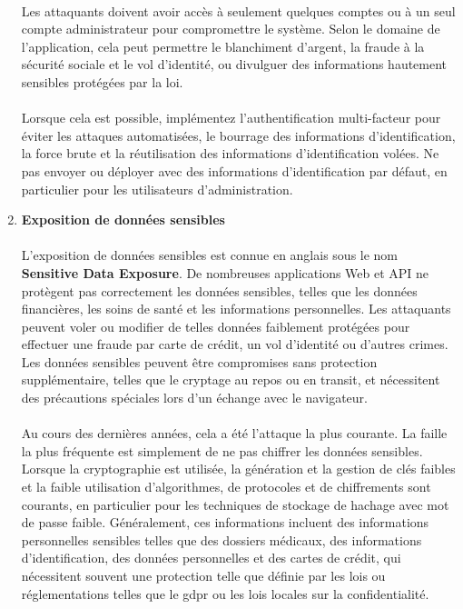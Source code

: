 \begin{enumerate}[label=\roman*)]
		\paragraph{}
		Les attaquants doivent avoir accès à seulement quelques comptes ou à un seul compte administrateur pour compromettre le système. Selon le domaine de l'application, cela peut permettre le blanchiment d'argent, la fraude à la sécurité sociale et le vol d'identité, ou divulguer des informations hautement sensibles protégées par la loi.
		\paragraph{}
		Lorsque cela est possible, implémentez l'authentification multi-facteur pour éviter les attaques automatisées, le bourrage des informations d'identification, la force brute et la réutilisation des informations d'identification volées. Ne pas envoyer ou déployer avec des informations d'identification par défaut, en particulier pour les utilisateurs d'administration.
		
		\vspace*{0.8cm} \item \textbf{Exposition de données sensibles} \vspace*{-0.4cm}
		\paragraph{}
		L'exposition de données sensibles est connue en anglais sous le nom \textbf{Sensitive Data Exposure}.
		De nombreuses applications Web et API ne protègent pas correctement les données sensibles, telles que les données financières, les soins de santé et les informations personnelles. Les attaquants peuvent voler ou modifier de telles données faiblement protégées pour effectuer une fraude par carte de crédit, un vol d'identité ou d'autres crimes. Les données sensibles peuvent être compromises sans protection supplémentaire, telles que le cryptage au repos ou en transit, et nécessitent des précautions spéciales lors d'un échange avec le navigateur.
		\paragraph{}
		Au cours des dernières années, cela a été l'attaque la plus courante. La faille la plus fréquente est simplement de ne pas chiffrer les données sensibles. Lorsque la cryptographie est utilisée, la génération et la gestion de clés faibles et la faible utilisation d'algorithmes, de protocoles et de chiffrements sont courants, en particulier pour les techniques de stockage de hachage avec mot de passe faible. 
		Généralement, ces informations incluent des informations personnelles sensibles telles que des dossiers médicaux, des informations d'identification, des données personnelles et des cartes de crédit, qui nécessitent souvent une protection telle que définie par les lois ou réglementations telles que le \gls{gdpr} ou les lois locales sur la confidentialité.

\end{enumerate}
